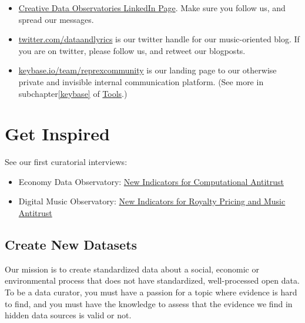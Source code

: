 \documentclass[
  a4paper,
  openany, a4paper, oneside]{book}
\providecommand{\tightlist}{%
  \setlength{\itemsep}{0pt}\setlength{\parskip}{0pt}}
\begin{document}
\begin{itemize}
\item
  \href{https://www.linkedin.com/company/reprexbv/}{Creative Data Observatories LinkedIn Page}. Make sure you follow us, and spread our messages.
\item
  \href{https://twitter.com/dataandlyrics}{twitter.com/dataandlyrics} is our twitter handle for our music-oriented blog. If you are on twitter, please follow us, and retweet our blogposts.
\item
  \href{https://keybase.io/team/reprexcommunity}{keybase.io/team/reprexcommunity} is our landing page to our otherwise private and invisible internal communication platform. (See more in subchapter\ref{keybase} of \protect\hyperlink{keybase}{Tools}.)
\end{itemize}

\hypertarget{get-inspired}{%
\section{Get Inspired}\label{get-inspired}}

See our first curatorial interviews:

\begin{itemize}
\tightlist
\item
  Economy Data Observatory: \href{https://economy.dataobservatory.eu/post/2021-06-02-data-curator-peter-ormosi/}{New Indicators for Computational Antitrust}
\item
  Digital Music Observatory: \href{https://music.dataobservatory.eu/post/2021-06-02-data-curator-eszter-kabai/}{New Indicators for Royalty Pricing and Music Antitrust}
\end{itemize}

\hypertarget{create-new-datasets}{%
\subsection{Create New Datasets}\label{create-new-datasets}}

Our mission is to create standardized data about a social, economic or environmental process that does not have standardized, well-processed open data. To be a data curator, you must have a passion for a topic where evidence is hard to find, and you must have the knowledge to assess that the evidence we find in hidden data sources is valid or not.
\end{document}
